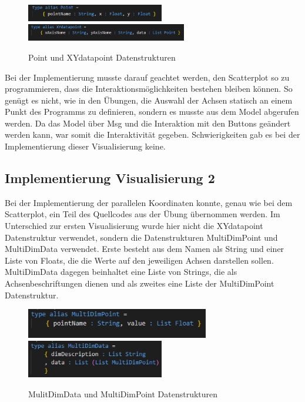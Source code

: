 \documentclass[usegeometry=true]{scrartcl}
\begin{document}
\begin{figure} [H]
	\begin{center}
		\includegraphics[width=6cm]{IMG/PointDatenstruktur}
		\includegraphics[width=7cm]{IMG/XYdatapoint}
		\caption{Point und XYdatapoint Datenstrukturen}
		\label{fig:Point_XYdatapoint}
	\end{center}
\end{figure}

\noindent Bei der Implementierung musste darauf geachtet werden, den Scatterplot so zu programmieren, dass die Interaktionsmöglichkeiten bestehen bleiben können.
So genügt es nicht, wie in den Übungen, die Auswahl der Achsen statisch an einem Punkt des Programms zu definieren, sondern es musste aus dem Model abgerufen werden. Da das
Model über Msg und die Interaktion mit den Buttons geändert werden kann, war somit die Interaktivität gegeben. Schwierigkeiten gab es bei der Implementierung dieser
Visualisierung keine.


\subsection{Implementierung Visualisierung 2}
Bei der Implementierung der parallelen Koordinaten konnte, genau wie bei dem Scatterplot, ein Teil des Quellcodes aus der Übung übernommen werden. Im Unterschied zur ersten
Visualisierung wurde hier nicht die XYdatapoint Datenstruktur verwendet, sondern die Datenstrukturen MultiDimPoint und MultiDimData verwendet. Erste besteht aus dem Namen als
String und einer Liste von Floats, die die Werte auf den jeweiligen Achsen darstellen sollen. MultiDimData dagegen beinhaltet eine Liste von Strings, die als Achsenbeschriftungen
dienen und als zweites eine Liste der MultiDimPoint Datenstruktur.
\begin{figure} [H]
	\begin{center}
		\includegraphics[width=8cm]{IMG/MultiDimPoint.png}
		\includegraphics[width=6cm]{IMG/MulitDimData.png}
		\caption{MulitDimData und MultiDimPoint Datenstrukturen}
		\label{fig:Datenstrukturen_ParCoord}
	\end{center}
\end{figure}
\end{document}

